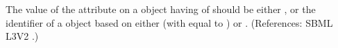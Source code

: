 The value of the attribute  on a \Compartment object having
 of  should be either 
, or the identifier of a \UnitDefinition object based on
either  (with  equal to ) or
.  (References: SBML L3V2
.)
